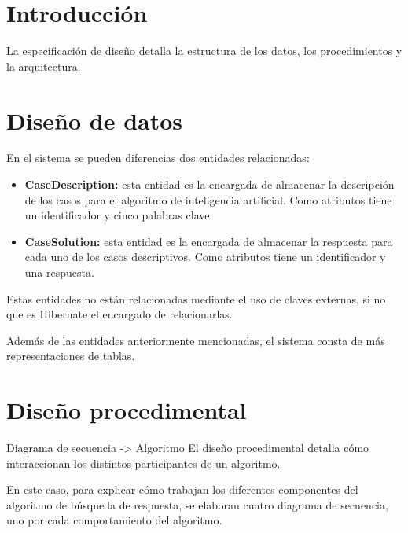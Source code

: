 
\section{Introducción}

La especificación de diseño detalla la estructura de los datos, los procedimientos y la arquitectura.

\section{Diseño de datos}

En el sistema se pueden diferencias dos entidades relacionadas:

\begin{itemize}
\tightlist
\item \textbf{CaseDescription:} esta entidad es la encargada de almacenar la descripción de los casos para el algoritmo de inteligencia artificial. Como atributos tiene un identificador y cinco palabras clave.
\item \textbf{CaseSolution:} esta entidad es la encargada de almacenar la respuesta para cada uno de los casos descriptivos. Como atributos tiene un identificador y una respuesta.
\end{itemize}

Estas entidades no están relacionadas mediante el uso de claves externas, si no que es Hibernate el encargado de relacionarlas.


Además de las entidades anteriormente mencionadas, el sistema consta de más representaciones de tablas.


\section{Diseño procedimental}

Diagrama de secuencia -> Algoritmo
El diseño procedimental detalla cómo interaccionan los distintos participantes de un algoritmo.

En este caso, para explicar cómo trabajan los diferentes componentes del algoritmo de búsqueda de respuesta, se elaboran cuatro diagrama de secuencia, uno por cada comportamiento del algoritmo.


